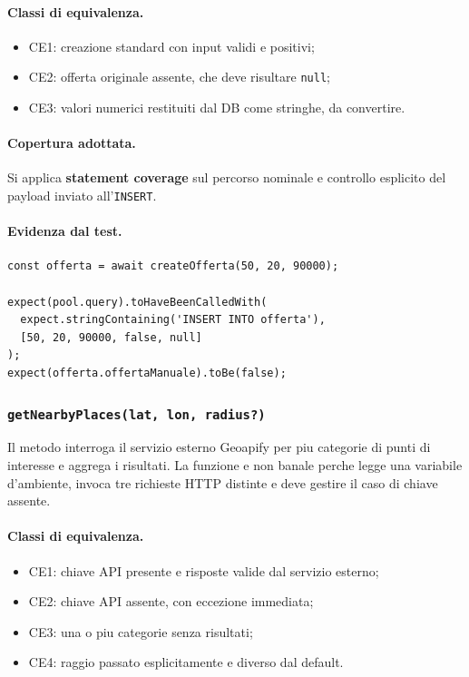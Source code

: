 \documentclass[a4paper,11pt]{article}
\begin{document}
\paragraph{Classi di equivalenza.}
\begin{itemize}
  \item CE1: creazione standard con input validi e positivi;
  \item CE2: offerta originale assente, che deve risultare \texttt{null};
  \item CE3: valori numerici restituiti dal DB come stringhe, da convertire.
\end{itemize}

\paragraph{Copertura adottata.}
Si applica \textbf{statement coverage} sul percorso nominale e controllo esplicito del payload inviato all'\texttt{INSERT}.

\paragraph{Evidenza dal test.}
\begin{lstlisting}[style=projectcode]
const offerta = await createOfferta(50, 20, 90000);

expect(pool.query).toHaveBeenCalledWith(
  expect.stringContaining('INSERT INTO offerta'),
  [50, 20, 90000, false, null]
);
expect(offerta.offertaManuale).toBe(false);
\end{lstlisting}

\subsubsection{\texttt{getNearbyPlaces(lat, lon, radius?)}}
Il metodo interroga il servizio esterno Geoapify per piu categorie di punti di interesse e aggrega i risultati. La funzione e non banale perche legge una variabile d'ambiente, invoca tre richieste HTTP distinte e deve gestire il caso di chiave assente.

\paragraph{Classi di equivalenza.}
\begin{itemize}
  \item CE1: chiave API presente e risposte valide dal servizio esterno;
  \item CE2: chiave API assente, con eccezione immediata;
  \item CE3: una o piu categorie senza risultati;
  \item CE4: raggio passato esplicitamente e diverso dal default.
\end{itemize}
\end{document}
